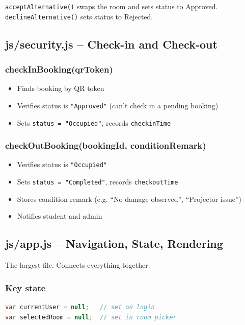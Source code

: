 \documentclass[12pt,a4paper]{article}
\begin{document}
\texttt{acceptAlternative()} swaps the room and sets status to Approved. \texttt{declineAlternative()} sets status to Rejected.

\subsection{js/security.js -- Check-in and Check-out}

\subsubsection{checkInBooking(qrToken)}
\begin{itemize}
  \item Finds booking by QR token
  \item Verifies status is \texttt{"Approved"} (can't check in a pending booking)
  \item Sets \texttt{status = "Occupied"}, records \texttt{checkinTime}
\end{itemize}

\subsubsection{checkOutBooking(bookingId, conditionRemark)}
\begin{itemize}
  \item Verifies status is \texttt{"Occupied"}
  \item Sets \texttt{status = "Completed"}, records \texttt{checkoutTime}
  \item Stores condition remark (e.g. ``No damage observed'', ``Projector issue'')
  \item Notifies student and admin
\end{itemize}

\subsection{js/app.js -- Navigation, State, Rendering}

The largest file. Connects everything together.

\subsubsection{Key state}
\begin{lstlisting}[language=Java]
var currentUser = null;   // set on login
var selectedRoom = null;  // set in room picker
\end{lstlisting}
\end{document}

